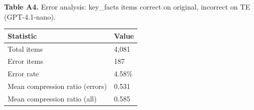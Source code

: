 \documentclass[
]{article}
\newcounter{none} %
\begin{document}
\textbf{Table A4.} Error analysis: key\_facts items correct on original,
incorrect on TE (GPT-4.1-nano).

{\def\LTcaptype{none} %
\begin{longtable}[]{@{}ll@{}}
\toprule\noalign{}
Statistic & Value \\
\midrule\noalign{}
\endhead
\bottomrule\noalign{}
\endlastfoot
Total items & 4,081 \\
Error items & 187 \\
Error rate & 4.58\% \\
Mean compression ratio (errors) & 0.531 \\
Mean compression ratio (all) & 0.585 \\
\end{longtable}
}
\end{document}
